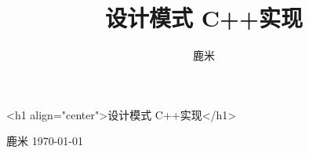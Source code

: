 \documentclass{book}
\title{设计模式 C++实现}
\author{鹿米}
\begin{document}
\begin{rawhtml}
<h1 align="center">设计模式 C++实现</h1>
\end{rawhtml}

\begin{center}
\end{center}

\begin{center}
鹿米
\today
\end{center}

\tableofcontents






\end{document}
